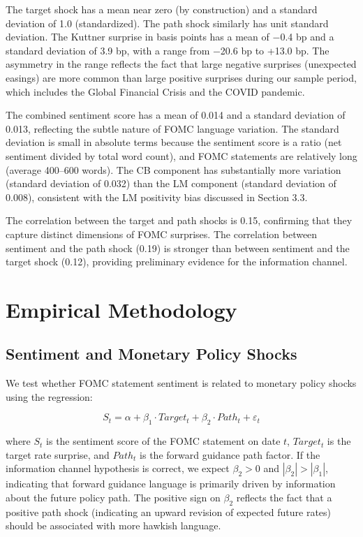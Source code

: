 \documentclass[12pt]{article}
\begin{document}
The target shock has a mean near zero (by construction) and a standard deviation of 1.0 (standardized). The path shock similarly has unit standard deviation. The Kuttner surprise in basis points has a mean of $-$0.4 bp and a standard deviation of 3.9 bp, with a range from $-$20.6 bp to +13.0 bp. The asymmetry in the range reflects the fact that large negative surprises (unexpected easings) are more common than large positive surprises during our sample period, which includes the Global Financial Crisis and the COVID pandemic.

The combined sentiment score has a mean of 0.014 and a standard deviation of 0.013, reflecting the subtle nature of FOMC language variation. The standard deviation is small in absolute terms because the sentiment score is a ratio (net sentiment divided by total word count), and FOMC statements are relatively long (average 400--600 words). The CB component has substantially more variation (standard deviation of 0.032) than the LM component (standard deviation of 0.008), consistent with the LM positivity bias discussed in Section 3.3.

The correlation between the target and path shocks is 0.15, confirming that they capture distinct dimensions of FOMC surprises. The correlation between sentiment and the path shock (0.19) is stronger than between sentiment and the target shock (0.12), providing preliminary evidence for the information channel.


\section{Empirical Methodology}

\subsection{Sentiment and Monetary Policy Shocks}

We test whether FOMC statement sentiment is related to monetary policy shocks using the regression:

\begin{equation*}
S_t = \alpha + \beta_1 \cdot Target_t + \beta_2 \cdot Path_t + \varepsilon_t
\end{equation*}

where $S_t$ is the sentiment score of the FOMC statement on date $t$, $Target_t$ is the target rate surprise, and $Path_t$ is the forward guidance path factor. If the information channel hypothesis is correct, we expect $\beta_2 > 0$ and $|\beta_2| > |\beta_1|$, indicating that forward guidance language is primarily driven by information about the future policy path. The positive sign on $\beta_2$ reflects the fact that a positive path shock (indicating an upward revision of expected future rates) should be associated with more hawkish language.
\end{document}

